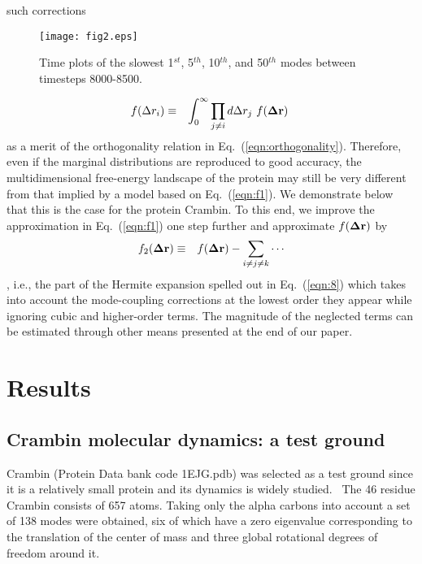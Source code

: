 \documentclass[12pt,article]{iopart}
\begin{document}
such corrections
\begin{figure*}[t!]\centering
\vspace*{0.5in}
  \texttt{[image: fig2.eps]}
\caption{Time plots of the slowest 1$^{st}$, 5$^{th}$, 10$^{th}$, and 50$^{th}$ modes between timesteps 8000-8500.}
\label{fig:timeplots}
\end{figure*}
\begin{eqnarray}
\label{marginal}
f(\Delta r_i) &\equiv& \int_0^\infty \prod_{j\ne i}d\Delta r_j\ f({\bf\Delta r})\ 
\end{eqnarray}
as a merit of the orthogonality relation in
Eq.~(\ref{eqn:orthogonality}). Therefore, even if the marginal
distributions are reproduced to good accuracy, the multidimensional
free-energy landscape of the protein may still be very different from
that implied by a model based on Eq.~(\ref{eqn:f1}). We demonstrate
below that this is the case for the protein Crambin. To this end,
we improve the approximation in Eq.~(\ref{eqn:f1}) one step
further and approximate $f({\bf\Delta r})$ by
\begin{eqnarray}
\label{eqn:f2}
f_2({\bf\Delta r}) &\equiv& f({\bf\Delta r}) - \sum_{i\ne j\ne k}\cdots
\end{eqnarray}
, i.e., the part of the Hermite expansion spelled out in
Eq.~(\ref{eqn:8}) which takes into account the mode-coupling
corrections at the lowest order they appear while ignoring cubic and
higher-order terms. The magnitude of the neglected terms can be
estimated through other means presented at the end of our paper.

\section{Results}

\subsection{Crambin molecular dynamics: a test ground}

Crambin (Protein Data bank code 1EJG.pdb) was selected as a test
ground since it is a relatively small protein and its dynamics is
widely
studied.~\cite{teeter1990harmonic,levitt1985protein,lange2006can} The
46 residue Crambin consists of 657 atoms. Taking only the alpha
carbons into account a set of 138 modes were obtained, six of which
have a zero eigenvalue corresponding to the translation of the center of mass 
and three global rotational degrees of freedom around it. 
\end{document}
